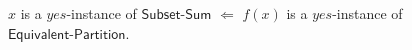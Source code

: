 \begin{parts}
\begin{subparts}
        \subpart[2] $x$ is a $yes$-instance of $\mathsf{Subset \text{-} Sum}$ $\Leftarrow$ $f(x)$ is a $yes$-instance of $\mathsf{Equivalent \text{-} Partition}$.

        \begin{solution}
            \vspace{4.5in}
        \end{solution}
    \end{subparts}
\end{parts}